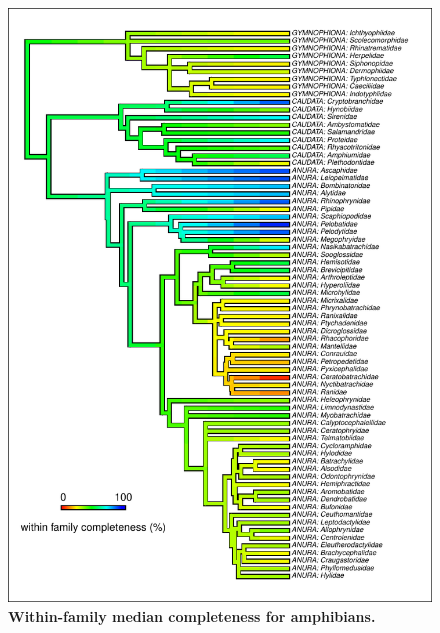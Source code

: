 \documentclass[11pt]{article}
\begin{document}
\begin{figure}[h!]
\centering
\includegraphics[scale=1.2]{figures/NA_phylo_patterns/Amphibians_completeness}
\caption[Within-family median completeness for amphibians]{\textbf{Within-family median completeness for amphibians.}}
\label{}
\end{figure}
\end{document}
